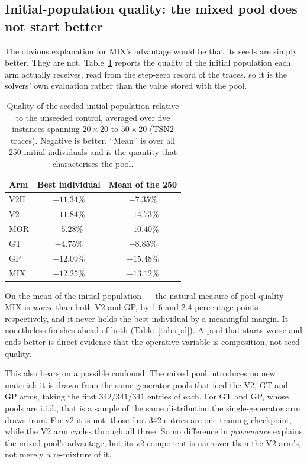 \documentclass[review]{elsarticle}
\begin{document}
\subsection{Initial-population quality: the mixed pool does not start
better}\label{sec:res-seedqual}

The obvious explanation for MIX's advantage would be that its seeds are
simply better. They are not. Table~\ref{tab:seedqual} reports the quality
of the initial population each arm actually receives, read from the
step-zero record of the traces, so it is the solvers' own evaluation rather
than the value stored with the pool.

\begin{table}[htbp]
\centering
\caption{Quality of the seeded initial population relative to the unseeded
control, averaged over five instances spanning $20\times20$ to
$50\times20$ (TSN2 traces). Negative is better. ``Mean'' is over all 250
initial individuals and is the quantity that characterises the pool.}
\label{tab:seedqual}
\begin{tabular}{lcc}
\toprule
Arm & Best individual & Mean of the 250 \\
\midrule
V2H & $-11.34\%$ & $-7.35\%$ \\
V2  & $-11.84\%$ & $-14.73\%$ \\
MOR & $-5.28\%$  & $-10.40\%$ \\
GT  & $-4.75\%$  & $-8.85\%$ \\
GP  & $\mathbf{-12.09\%}$ & $\mathbf{-15.48\%}$ \\
MIX & $-12.25\%$ & $-13.12\%$ \\
\bottomrule
\end{tabular}
\end{table}

On the mean of the initial population --- the natural measure of pool
quality --- MIX is \emph{worse} than both V2 and GP, by 1.6 and 2.4
percentage points respectively, and it never holds the best individual by a
meaningful margin. It nonetheless finishes ahead of both
(Table~\ref{tab:rpd}). A pool that starts worse and ends better is direct
evidence that the operative variable is composition, not seed quality.

This also bears on a possible confound. The mixed pool introduces no new
material: it is drawn from the same generator pools that feed the V2, GT
and GP arms, taking the first $342/341/341$ entries of each. For GT and GP,
whose pools are i.i.d., that is a sample of the same distribution the
single-generator arm draws from. For v2 it is not: those first 342 entries
are one training checkpoint, while the V2 arm cycles through all three. So
no difference in \emph{provenance} explains the mixed pool's advantage, but
its v2 component is narrower than the V2 arm's, not merely a re-mixture of
it.
\end{document}
